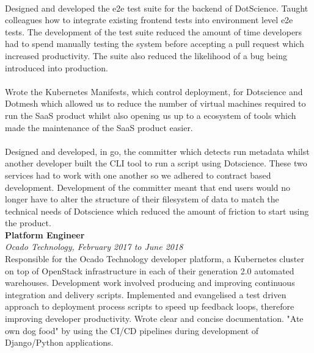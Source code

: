 \documentclass{article}
\begin{document}
\begin{flushleft}
\paragraph{}Designed and developed the e2e test suite for the backend of DotScience. Taught colleagues how to integrate existing frontend tests into environment level e2e tests. The development of the test suite reduced the amount of time developers had to spend manually testing the system before accepting a pull request which increased productivity. The suite also reduced the likelihood of a bug being introduced into production. 

\paragraph{}Wrote the Kubernetes Manifests, which control deployment, for Dotscience and Dotmesh which allowed us to reduce the number of virtual machines required to run the SaaS product whilst also opening us up to a ecosystem of tools which made the maintenance of the SaaS product easier.

\paragraph{}Designed and developed, in go, the committer which detects run metadata whilst another developer built the CLI tool to run a script using Dotscience. These two services had to work with one another so we adhered to contract based development. Development of the committer meant that end users would no longer have to alter the structure of their filesystem of data to match the technical needs of Dotscience which reduced the amount of friction to start using the product.\\[10pt]

\textbf{Platform Engineer}\\
\textit{Ocado Technology, February 2017 to June 2018}\\[5pt]
Responsible for the Ocado Technology developer platform, a Kubernetes cluster on top of OpenStack infrastructure in each of their generation 2.0 automated warehouses. Development work involved producing and improving continuous integration and delivery scripts. Implemented and evangelised a test driven approach to deployment process scripts to speed up feedback loops, therefore improving developer productivity. Wrote clear and concise documentation. "Ate own dog food" by using the CI/CD pipelines during development of Django/Python applications.


\end{flushleft}
\end{document}
